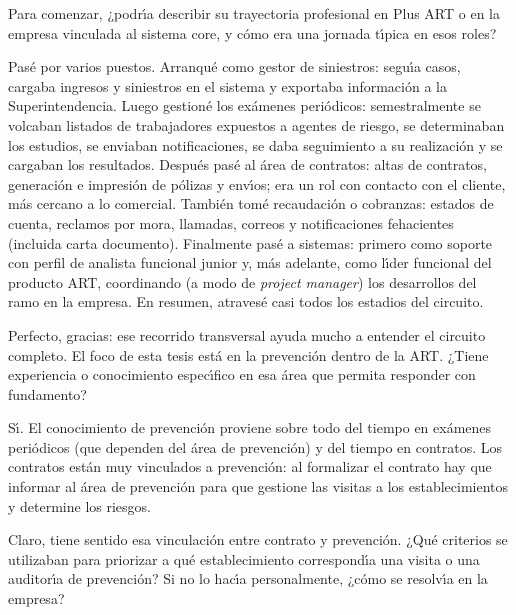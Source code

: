 \begin{description}[style=nextline, leftmargin=0cm, labelsep=0.35cm]

\item[\textbf{Entrevistador:}]
Para comenzar, ¿podr\'{\i}a describir su trayectoria profesional en Plus ART o en la empresa vinculada al sistema core, y c\'omo era una jornada t\'{\i}pica en esos roles?

\item[\textbf{Entrevistado:}]
Pas\'e por varios puestos.
Arranqu\'e como gestor de siniestros: segu\'{\i}a casos, cargaba ingresos y siniestros en el sistema y exportaba informaci\'on a la Superintendencia.
Luego gestion\'e los ex\'amenes peri\'odicos: semestralmente se volcaban listados de trabajadores expuestos a agentes de riesgo, se determinaban los estudios, se enviaban notificaciones, se daba seguimiento a su realizaci\'on y se cargaban los resultados.
Despu\'es pas\'e al \'area de contratos: altas de contratos, generaci\'on e impresi\'on de p\'olizas y env\'{\i}os; era un rol con contacto con el cliente, m\'as cercano a lo comercial.
Tambi\'en tom\'e recaudaci\'on o cobranzas: estados de cuenta, reclamos por mora, llamadas, correos y notificaciones fehacientes (incluida carta documento).
Finalmente pas\'e a sistemas: primero como soporte con perfil de analista funcional junior y, m\'as adelante, como l\'{\i}der funcional del producto ART, coordinando (a modo de \emph{project manager}) los desarrollos del ramo en la empresa.
En resumen, atraves\'e casi todos los estadios del circuito.

\item[\textbf{Entrevistador:}]
Perfecto, gracias: ese recorrido transversal ayuda mucho a entender el circuito completo.
El foco de esta tesis est\'a en la prevenci\'on dentro de la ART.
¿Tiene experiencia o conocimiento espec\'{\i}fico en esa \'area que permita responder con fundamento?

\item[\textbf{Entrevistado:}]
S\'{\i}.
El conocimiento de prevenci\'on proviene sobre todo del tiempo en ex\'amenes peri\'odicos (que dependen del \'area de prevenci\'on) y del tiempo en contratos.
Los contratos est\'an muy vinculados a prevenci\'on: al formalizar el contrato hay que informar al \'area de prevenci\'on para que gestione las visitas a los establecimientos y determine los riesgos.

\item[\textbf{Entrevistador:}]
Claro, tiene sentido esa vinculaci\'on entre contrato y prevenci\'on.
¿Qu\'e criterios se utilizaban para priorizar a qu\'e establecimiento correspond\'{\i}a una visita o una auditor\'{\i}a de prevenci\'on?
Si no lo hac\'{\i}a personalmente, ¿c\'omo se resolv\'{\i}a en la empresa?


\end{description}
